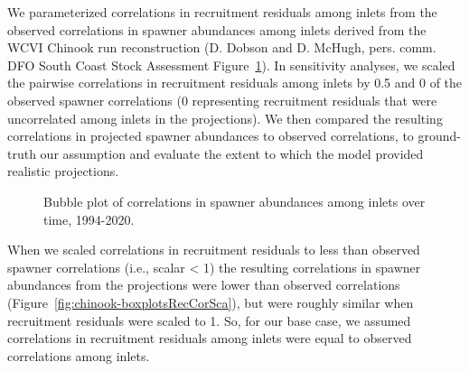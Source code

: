 \documentclass[11pt]{book}
\begin{document}
We parameterized correlations in recruitment residuals among inlets from the observed correlations in spawner abundances among inlets derived from the WCVI Chinook run reconstruction (D. Dobson and D. McHugh, pers. comm. DFO South Coast Stock Assessment Figure~\ref{fig:chinook-bubbleCor}). In sensitivity analyses, we scaled the pairwise correlations in recruitment residuals among inlets by 0.5 and 0 of the observed spawner correlations (0 representing recruitment residuals that were uncorrelated among inlets in the projections). We then compared the resulting correlations in projected spawner abundances to observed correlations, to ground-truth our assumption and evaluate the extent to which the model provided realistic projections.
\begin{figure}[htb]

{\centering {} 

}

\caption{ Bubble plot of correlations in spawner abundances among inlets over time, 1994-2020.}\label{fig:chinook-bubbleCor}
\end{figure}
When we scaled correlations in recruitment residuals to less than observed spawner correlations (i.e., scalar \textless{} 1) the resulting correlations in spawner abundances from the projections were lower than observed correlations (Figure~\ref{fig:chinook-boxplotsRecCorSca}), but were roughly similar when recruitment residuals were scaled to 1. So, for our base case, we assumed correlations in recruitment residuals among inlets were equal to observed correlations among inlets.
\end{document}
